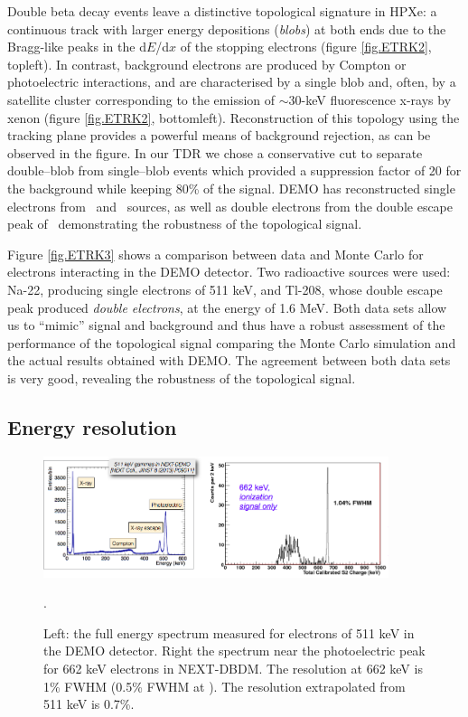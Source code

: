 Double beta decay events leave a distinctive topological signature in HPXe: a continuous track with larger energy depositions (\emph{blobs}) at both ends due to the Bragg-like peaks in the d$E$/d$x$ of the stopping electrons (figure \ref{fig.ETRK2}, topleft). In contrast, background electrons are produced by Compton or photoelectric interactions, and are characterised by a single blob and, often, by a satellite cluster corresponding to the emission of $\sim30$-keV fluorescence x-rays by xenon (figure \ref{fig.ETRK2}, bottomleft).
Reconstruction of this topology using the tracking plane provides a powerful means of background rejection, as can be observed in the figure. In our TDR we chose a conservative cut to separate double--blob from single--blob events which provided a suppression factor of 20 for the background while keeping 80\% of the signal.  DEMO has reconstructed single electrons from \NA\ and \CS\ sources, as well as double electrons from the double escape peak of \TL\, demonstrating the robustness of the topological signal. 

%
Figure \ref{fig.ETRK3} shows a comparison between data and Monte Carlo for electrons interacting in the DEMO detector. Two radioactive sources were used: Na-22, producing single electrons of 511 keV, and Tl-208, whose double escape peak produced {\em double electrons}, at the energy of 1.6 MeV. Both data sets allow us to ``mimic'' signal and background and thus have a robust assessment of the performance of the topological signal comparing the Monte Carlo simulation and the actual results obtained with DEMO. The agreement between both data sets is very good, revealing the robustness of the topological signal. 

\subsection{Energy resolution}

\begin{figure}
\centering
\includegraphics[width=0.9\textwidth]{img/EResolution.png}
\caption{\small Left: the full energy spectrum measured for electrons of 511 keV in the DEMO detector. Right the spectrum near the photoelectric peak for 662 keV electrons in NEXT-DBDM. The resolution at 662 keV is 1\% FWHM (0.5\% FWHM at \Qbb). The resolution extrapolated from 511 keV is 0.7\%.}\label{fig.ERES}. 
\end{figure}


